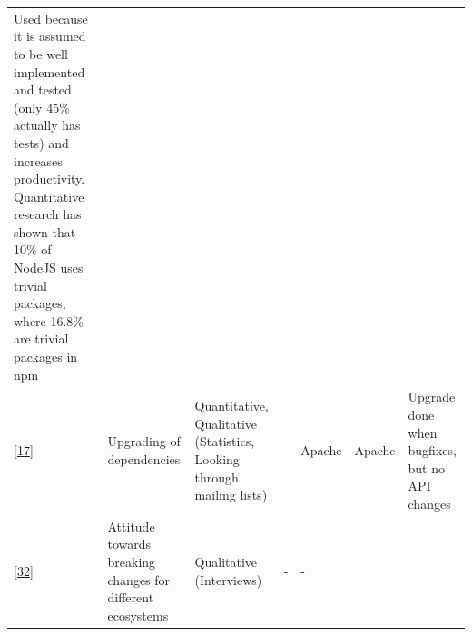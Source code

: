 \documentclass[]{book}
\begin{document}
\begin{longtable}[]{@{}lllllll@{}}
\begin{minipage}[t]{0.10\columnwidth}
Used because it is assumed to be well implemented and tested (only 45\%
actually has tests) and increases productivity. Quantitative research
has shown that 10\% of NodeJS uses trivial packages, where 16.8\% are
trivial packages in npm\strut
\end{minipage}\tabularnewline
\begin{minipage}[t]{0.09\columnwidth}\raggedright\strut
{[}\protect\hyperlink{ref-Bavota2014}{17}{]}\strut
\end{minipage} & \begin{minipage}[t]{0.16\columnwidth}\raggedright\strut
Upgrading of dependencies\strut
\end{minipage} & \begin{minipage}[t]{0.17\columnwidth}\raggedright\strut
Quantitative, Qualitative (Statistics, Looking through mailing
lists)\strut
\end{minipage} & \begin{minipage}[t]{0.07\columnwidth}\raggedright\strut
-\strut
\end{minipage} & \begin{minipage}[t]{0.10\columnwidth}\raggedright\strut
Apache\strut
\end{minipage} & \begin{minipage}[t]{0.12\columnwidth}\raggedright\strut
Apache\strut
\end{minipage} & \begin{minipage}[t]{0.10\columnwidth}\raggedright\strut
Upgrade done when bugfixes, but no API changes\strut
\end{minipage}\tabularnewline
\begin{minipage}[t]{0.09\columnwidth}\raggedright\strut
{[}\protect\hyperlink{ref-Bogart2016}{32}{]}\strut
\end{minipage} & \begin{minipage}[t]{0.16\columnwidth}\raggedright\strut
Attitude towards breaking changes for different ecosystems\strut
\end{minipage} & \begin{minipage}[t]{0.17\columnwidth}\raggedright\strut
Qualitative (Interviews)\strut
\end{minipage} & \begin{minipage}[t]{0.07\columnwidth}\raggedright\strut
-\strut
\end{minipage} & \begin{minipage}[t]{0.10\columnwidth}\raggedright\strut
-\strut
\end{minipage} & \begin{minipage}[t]{0.12\columnwidth}\raggedright\strut

\end{minipage}
\end{longtable}
\end{document}
